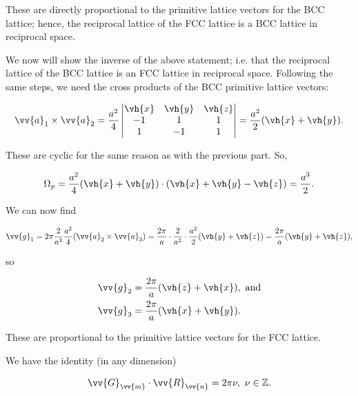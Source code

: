 \begin{parts}
  These are directly proportional to the primitive lattice vectors for the BCC lattice; hence, the reciprocal lattice of the FCC lattice is a BCC lattice in reciprocal space.

  We now will show the inverse of the above statement; i.e. that the reciprocal lattice of the BCC lattice is an FCC lattice in reciprocal space. Following the same steps, we need the cross products of the BCC primitive lattice vectors:

  \begin{equation}
    \vv{a}_1 \times \vv{a}_2 = \frac{a^2}{4} \begin{vmatrix} \vh{x} & \vh{y} & \vh{z} \\ -1 & 1 & 1 \\ 1 & -1 & 1 \end{vmatrix} = \frac{a^2}{2}(\vh{x} + \vh{y}).
  \end{equation}

  These are cyclic for the same reason as with the previous part. So,

  \begin{equation}
    \Omega_p = \frac{a^2}{4}(\vh{x} + \vh{y}) \cdot (\vh{x} + \vh{y} - \vh{z}) = \frac{a^3}{2}.
  \end{equation}

  We can now find

  \begin{equation}
    \vv{g}_1 = 2\pi \frac{2}{a^3} \frac{a^2}{4} (\vv{a}_2 \times \vv{a}_3) = \frac{2\pi}{a} \cdot \frac{2}{a^2} \cdot \frac{a^2}{2}(\vh{y} + \vh{z}) = \frac{2\pi}{a}(\vh{y} + \vh{z}), 
  \end{equation}

  so

  \begin{align}
    \vv{g}_2 &= \frac{2\pi}{a}(\vh{z} + \vh{x}),\ \text{and} \\
    \vv{g}_3 &= \frac{2\pi}{a}(\vh{x} + \vh{y}).
  \end{align}

  These are proportional to the primitive lattice vectors for the FCC lattice.



\item We have the identity (in any dimension)

  \begin{equation}
    \vv{G}_{\vv{m}} \cdot \vv{R}_{\vv{n}} = 2\pi\nu,\ \nu\in\mathbb{Z}.
  \end{equation}


\end{parts}
